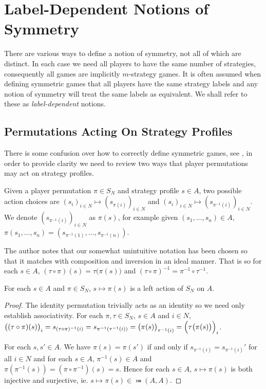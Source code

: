 \section{Label-Dependent Notions of Symmetry} \label{sec:labdepnotions}
There are various ways to define a notion of symmetry, not all of which are distinct. In each case we need all players to have the same number of strategies, consequently all games are implicitly $m$-strategy games. It is often assumed when defining symmetric games that all players have the same strategy labels and any notion of symmetry will treat the same labels as equivalent. We shall refer to these as \textit{label-dependent} notions. 

\subsection{Permutations Acting On Strategy Profiles}
There is some confusion over how to correctly define symmetric games, see \cite[Definition 7]{DMaskin}, in order to provide clarity we need to review two ways that player permutations may act on strategy profiles. 

Given a player permutation $\pi \in S_N$ and strategy profile $s \in A$, two possible action choices are $(s_i)_{i \in N} \mapsto (s_{\pi(i)})_{i \in N}$ and $(s_i)_{i \in N} \mapsto (s_{\pi^{-1}(i)})_{i \in N}$. We denote $(s_{\pi^{-1}(i)})_{i \in N}$ as $\pi(s)$, for example given $(s_1, \ldots, s_n) \in A$, $\pi(s_1, \ldots, s_n) = (s_{\pi^{-1}(1)}, \ldots, s_{\pi^{-1}(n)})$.

The author notes that our somewhat unintuitive notation has been chosen so that it matches with composition and inversion in an ideal manner. That is so for each $s \in A$, $(\tau \circ \pi)(s) = \tau\bigl(\pi(s)\bigr)$ and $(\tau \circ \pi)^{-1} = \pi^{-1} \circ \tau^{-1}$. 

\begin{lemma} \label{simpleactionprop}
	For each $s \in A$ and $\pi \in S_N$, $s \mapsto \pi(s)$ is a left action of $S_N$ on $A$.
	\begin{proof}
		The identity permutation trivially acts as an identity so we need only establish associativity. For each $\pi, \tau \in S_N$, $s \in A$ and $i \in N$, $\bigl((\tau \circ \pi)(s)\bigr)_i = s_{(\tau \circ \pi)^{-1}(i)} = s_{\pi^{-1}(\tau^{-1}(i))} = \bigl(\pi(s)\bigr)_{\tau^{-1}(i)} = \Bigl(\tau\bigl(\pi(s)\bigr)\Bigr)_i$.
		
		For each $s, s' \in A$. We have $\pi(s) = \pi(s')$ if and only if $s_{\pi^{-1}(i)} = s_{\pi^{-1}(i)}'$ for all $i \in N$ and for each $s \in A$, $\pi^{-1}(s) \in A$ and $\pi(\pi^{-1}(s)) = (\pi \circ \pi^{-1})(s) = s$. Hence for each $s \in A$, $s \mapsto \pi(s)$ is both injective and surjective, ie. $s \mapsto \pi(s) \in \bij(A, A)$.
	\end{proof}
\end{lemma}

